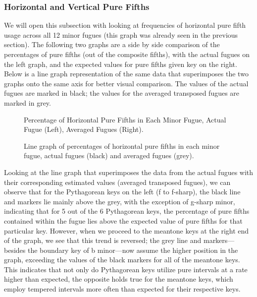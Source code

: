 \subsubsection{Horizontal and Vertical Pure
Fifths}\label{horizontal-and-vertical-pure-fifths}

We will open this subsection with looking at frequencies of horizontal
pure fifth usage across all 12 minor fugues (this graph was already seen
in the previous section). The following two graphs are a side by side
comparison of the percentages of pure fifths (out of the composite
fifths), with the actual fugues on the left graph, and the expected
values for pure fifths given key on the right. Below is a line graph
representation of the same data that superimposes the two graphs onto
the same axis for better visual comparison. The values of the actual
fugues are marked in black; the values for the averaged transposed
fugues are marked in grey.



\begin{figure}[H]
    \begin{center}
    \caption[Percentage of Horizontal Pure Fifths in Each Minor Fugue. ]{Percentage of Horizontal Pure Fifths in Each Minor Fugue, Actual Fugue (Left), Averaged Fugues (Right).}
    \end{center}
\end{figure}
    



\begin{figure}[H]
    \begin{center}
    \caption[Line graph of percentages of horizontal pure fifths in each minor fugue, actual fugues vs. averaged fugues. ]{Line graph of percentages of horizontal pure fifths in each minor fugue, actual fugues (black) and averaged fugues (grey).}
    \end{center}
\end{figure}
    
    Looking at the line graph that superimposes the data from the actual
fugues with their corresponding estimated values (averaged transposed
fugues), we can observe that for the Pythagorean keys on the left (f to
f-sharp), the black line and markers lie mainly above the grey, with the
exception of g-sharp minor, indicating that for 5 out of the 6
Pythagorean keys, the percentage of pure fifths contained within the
fugue lies above the expected value of pure fifths for that particular
key. However, when we proceed to the meantone keys at the right end of
the graph, we see that this trend is reversed; the grey line and
markers---besides the boundary key of b minor---now assume the
higher position in the graph, exceeding the values of the black markers
for all of the meantone keys. This indicates that not only do
Pythagorean keys utilize pure intervals at a rate higher than expected,
the opposite holds true for the meantone keys, which employ tempered
intervals more often than expected for their respective keys.

